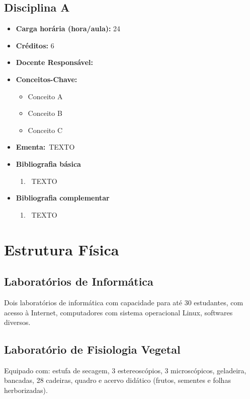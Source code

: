 \documentclass[11pt,fleqn]{book} %
\newcommand{\VER}[1]{\begingroup\color{red}#1\endgroup}
\begin{document}
\section{Disciplina A}\label{disc:interacoes}
\begin{itemize}
	\item \textbf{Carga horária (hora/aula):} 24
	\item \textbf{Créditos:} 6
	\item \textbf{Docente Responsável:} 
	\item \textbf{Conceitos-Chave:}
	\begin{itemize}
		\item Conceito A
		\item Conceito B
		\item Conceito C
	\end{itemize}
	\item \textbf{Ementa:}~\VER{TEXTO}
	\item \textbf{Bibliografia básica}
	\begin{enumerate}
		\item~\VER{TEXTO}
	\end{enumerate}
	\item \textbf{Bibliografia complementar}
	\begin{enumerate}
		\item~\VER{TEXTO}
	\end{enumerate}	
\end{itemize}



\chapter{Estrutura Física}
\vspace{12em}

\section{Laboratórios de Informática}
Dois laboratórios de informática com capacidade para até 30 estudantes, com acesso à Internet, computadores com sistema operacional Linux, softwares diversos.


\section{Laboratório de Fisiologia Vegetal}
Equipado com: estufa de secagem, 3 estereoscópios, 3 microscópicos, geladeira, bancadas, 28 cadeiras, quadro e acervo didático (frutos, sementes e folhas herborizadas). 
\end{document}
